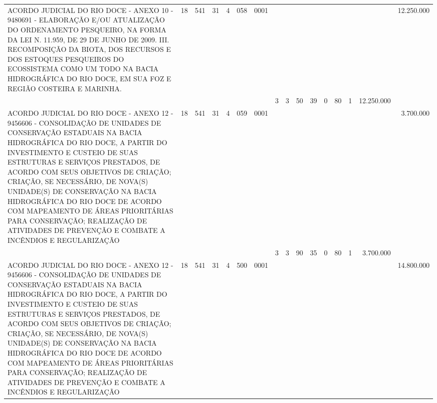 \documentclass{article}
\begin{document}
\begin{longtable}[c]{m{6.5cm}|m{1pt}m{1pt}m{1pt}m{1pt}m{1pt}m{1pt}|m{1pt}m{1pt}m{0.5pt}m{1pt}|m{1pt}|m{1pt}m{1pt}|m{1pt}|m{2pt}}
\multicolumn{1}{L{5.5cm}|}{ ACORDO JUDICIAL DO RIO DOCE - ANEXO 10 - 9480691 - ELABORAÇÃO E/OU ATUALIZAÇÃO DO ORDENAMENTO PESQUEIRO, NA FORMA DA LEI N. 11.959, DE 29 DE JUNHO DE 2009. III. RECOMPOSIÇÃO DA BIOTA, DOS RECURSOS E DOS ESTOQUES PESQUEIROS DO ECOSSISTEMA COMO UM TODO NA BACIA HIDROGRÁFICA DO RIO DOCE, EM SUA FOZ E REGIÃO COSTEIRA E MARINHA. } & \multicolumn{1}{c}{ 18 } & \multicolumn{1}{c}{ 541 } & \multicolumn{1}{c}{ 31 } & \multicolumn{1}{l}{ 4 } & \multicolumn{1}{c}{ 058 } & \multicolumn{1}{l|}{ 0001 } & & & & & & & & & \multicolumn{1}{r}{ 12.250.000 } \\
& & & & & & & \multicolumn{1}{c}{ 3 } & \multicolumn{1}{c}{ 3 } & \multicolumn{1}{c}{ 50 } & \multicolumn{1}{c|}{ 39 } & \multicolumn{1}{c|}{ 0 } & \multicolumn{1}{l}{ 80 } & \multicolumn{1}{c|}{ 1 } & \multicolumn{1}{r|}{ 12.250.000 } & \\
\multicolumn{1}{L{5.5cm}|}{ ACORDO JUDICIAL DO RIO DOCE - ANEXO 12 - 9456606 - CONSOLIDAÇÃO DE UNIDADES DE CONSERVAÇÃO ESTADUAIS NA BACIA HIDROGRÁFICA DO RIO DOCE, A PARTIR DO INVESTIMENTO E CUSTEIO DE SUAS ESTRUTURAS E SERVIÇOS PRESTADOS, DE ACORDO COM SEUS OBJETIVOS DE CRIAÇÃO; CRIAÇÃO, SE NECESSÁRIO, DE NOVA(S) UNIDADE(S) DE CONSERVAÇÃO NA BACIA HIDROGRÁFICA DO RIO DOCE DE ACORDO COM MAPEAMENTO DE ÁREAS PRIORITÁRIAS PARA CONSERVAÇÃO; REALIZAÇÃO DE ATIVIDADES DE PREVENÇÃO E COMBATE A INCÊNDIOS E REGULARIZAÇÃO } & \multicolumn{1}{c}{ 18 } & \multicolumn{1}{c}{ 541 } & \multicolumn{1}{c}{ 31 } & \multicolumn{1}{l}{ 4 } & \multicolumn{1}{c}{ 059 } & \multicolumn{1}{l|}{ 0001 } & & & & & & & & & \multicolumn{1}{r}{ 3.700.000 } \\
& & & & & & & \multicolumn{1}{c}{ 3 } & \multicolumn{1}{c}{ 3 } & \multicolumn{1}{c}{ 90 } & \multicolumn{1}{c|}{ 35 } & \multicolumn{1}{c|}{ 0 } & \multicolumn{1}{l}{ 80 } & \multicolumn{1}{c|}{ 1 } & \multicolumn{1}{r|}{ 3.700.000 } & \\
\multicolumn{1}{L{5.5cm}|}{ ACORDO JUDICIAL DO RIO DOCE - ANEXO 12 - 9456606 - CONSOLIDAÇÃO DE UNIDADES DE CONSERVAÇÃO ESTADUAIS NA BACIA HIDROGRÁFICA DO RIO DOCE, A PARTIR DO INVESTIMENTO E CUSTEIO DE SUAS ESTRUTURAS E SERVIÇOS PRESTADOS, DE ACORDO COM SEUS OBJETIVOS DE CRIAÇÃO; CRIAÇÃO, SE NECESSÁRIO, DE NOVA(S) UNIDADE(S) DE CONSERVAÇÃO NA BACIA HIDROGRÁFICA DO RIO DOCE DE ACORDO COM MAPEAMENTO DE ÁREAS PRIORITÁRIAS PARA CONSERVAÇÃO; REALIZAÇÃO DE ATIVIDADES DE PREVENÇÃO E COMBATE A INCÊNDIOS E REGULARIZAÇÃO } & \multicolumn{1}{c}{ 18 } & \multicolumn{1}{c}{ 541 } & \multicolumn{1}{c}{ 31 } & \multicolumn{1}{l}{ 4 } & \multicolumn{1}{c}{ 500 } & \multicolumn{1}{l|}{ 0001 } & & & & & & & & & \multicolumn{1}{r}{ 14.800.000 } \\

\end{longtable}
\end{document}
